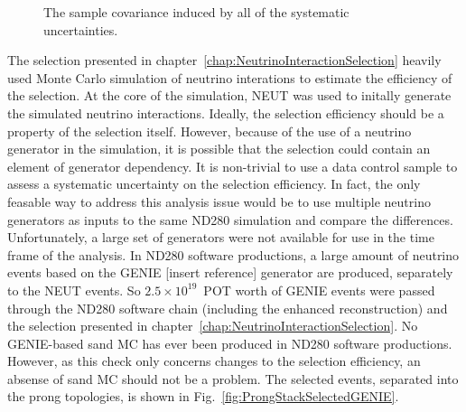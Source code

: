 \begin{figure}%
  \centering
  \caption{The sample covariance induced by all of the systematic uncertainties.}
  \label{fig:TotalCovarianceMatrices}
\end{figure}
\newline
\newline
The selection presented in chapter~\ref{chap:NeutrinoInteractionSelection} heavily used Monte Carlo simulation of neutrino interations to estimate the efficiency of the selection.  At the core of the simulation, NEUT was used to initally generate the simulated neutrino interactions.  Ideally, the selection efficiency should be a property of the selection itself.  However, because of the use of a neutrino generator in the simulation, it is possible that the selection could contain an element of generator dependency.  It is non-trivial to use a data control sample to assess a systematic uncertainty on the selection efficiency.  In fact, the only feasable way to address this analysis issue would be to use multiple neutrino generators as inputs to the same ND280 simulation and compare the differences.  Unfortunately, a large set of generators were not available for use in the time frame of the analysis.  In ND280 software productions, a large amount of neutrino events based on the GENIE [insert reference] generator are produced, separately to the NEUT events.  So $2.5\times 10^{19}$~POT worth of GENIE events were passed through the ND280 software chain (including the enhanced reconstruction) and the selection presented in chapter~\ref{chap:NeutrinoInteractionSelection}.  No GENIE-based sand MC has ever been produced in ND280 software productions.  However, as this check only concerns changes to the selection efficiency, an absense of sand MC should not be a problem.  The selected events, separated into the prong topologies, is shown in Fig.~\ref{fig:ProngStackSelectedGENIE}.

